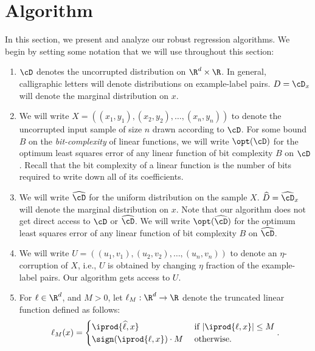 





\section{Algorithm}
In this section, we present and analyze our robust regression algorithms. %
We begin by setting some notation that we will use throughout this section:
\begin{enumerate}
\item $\cD$ denotes the uncorrupted distribution on $\R^d \times \R$. In general, calligraphic letters will denote distributions on example-label pairs. $D = \cD_x$ will denote the marginal distribution on $x$. 

\item We will write $X= ((x_1,y_1), (x_2,y_2), \ldots, (x_n,y_n))$ to denote the uncorrupted input sample of size $n$ drawn according to $\cD$. For some bound $B$ on the \emph{bit-complexity} of linear functions, we will write $\opt(\cD)$ for the optimum least squares error of any linear function of bit complexity $B$ on $\cD$. Recall that the bit complexity of a linear function is the number of bits required to write down all of its coefficients.  

\item We will write $\widehat{\cD}$ for the uniform distribution on the sample $X$. $\widehat{D} = \widehat{\cD}_x$ will denote the marginal distribution on $x$. Note that our algorithm does not get direct access to $\cD$ or $\widehat{\cD}$. We will write $\opt(\widehat{\cD})$ for the optimum least squares error of any linear function of bit complexity $B$ on $\widehat{\cD}$.

\item We will write $U = ((u_1, v_1), (u_2, v_2), \ldots, (u_n, v_n))$ to denote an $\eta$-corruption of $X$, i.e., $U$ is obtained by changing $\eta$ fraction of the example-label pairs. Our algorithm gets access to $U$. 
\item For $\ell \in \R^d$, and $M > 0$, let $\ell_M:\R^d \to \R$ denote the truncated linear function defined as follows: 
$$\ell_M (x) = \begin{cases} \iprod{\widehat{\ell},x} & \text{ if } |\iprod{\ell,x}| \leq M \\
       \sign(\iprod{\ell,x}) \cdot M & \text{ otherwise.}
       \end{cases}.$$

\end{enumerate}

